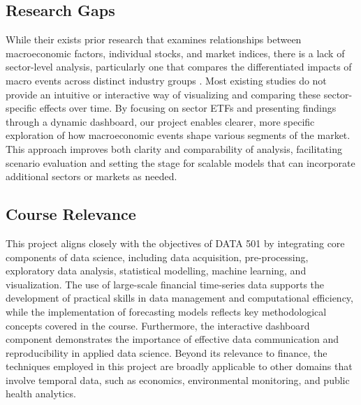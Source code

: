 \documentclass{article}
\begin{document}


\subsection{Research Gaps}
While their exists prior research that examines relationships between macroeconomic factors, individual stocks, and market indices, there is a lack of sector-level analysis, particularly one that compares the differentiated impacts of macro events across distinct industry groups \cite{alomari2024}. Most existing studies do not provide an intuitive or interactive way of visualizing and comparing these sector-specific effects over time. By focusing on sector ETFs and presenting findings through a dynamic dashboard, our project enables clearer, more specific exploration of how macroeconomic events shape various segments of the market. This approach improves both clarity and comparability of analysis, facilitating scenario evaluation and setting the stage for scalable models that can incorporate additional sectors or markets as needed.

\subsection{Course Relevance}
This project aligns closely with the objectives of DATA 501 by integrating core components of data science, including data acquisition, pre-processing, exploratory data analysis, statistical modelling, machine learning, and visualization. The use of large-scale financial time-series data supports the development of practical skills in data management and computational efficiency, while the implementation of forecasting models reflects key methodological concepts covered in the course. Furthermore, the interactive dashboard component demonstrates the importance of effective data communication and reproducibility in applied data science. Beyond its relevance to finance, the techniques employed in this project are broadly applicable to other domains that involve temporal data, such as economics, environmental monitoring, and public health analytics.
\end{document}
